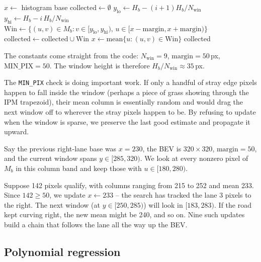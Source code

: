 \begin{algorithm}[H]
\caption{Sliding-window lane-pixel collection (per side)}
\begin{algorithmic}[1]
\State $x \gets$ histogram base
\State $\text{collected}\gets\emptyset$
  \State $y_{\text{lo}} \gets H_b - (i{+}1)H_b/N_{\text{win}}$
  \State $y_{\text{hi}} \gets H_b - i\,H_b/N_{\text{win}}$
  \State $\text{Win}\gets\{(u,v)\in M_b: v\in[y_{\text{lo}},y_{\text{hi}}),\, u\in[x-\text{margin},x+\text{margin})\}$
  \State $\text{collected}\gets\text{collected}\cup\text{Win}$
    \State $x \gets \mathrm{mean}\{u:(u,v)\in\text{Win}\}$
  \EndIf
\EndFor
\State \Return collected
\end{algorithmic}
\end{algorithm}

The constants come straight from the code: $N_{\text{win}}=9$,
$\text{margin}=50$\,px, $\text{MIN\_PIX}=50$. The window height is
therefore $H_b/N_{\text{win}}\approx 35$\,px.

The \texttt{MIN\_PIX} check is doing important work. If only a handful
of stray edge pixels happen to fall inside the window (perhaps a piece
of grass showing through the IPM trapezoid), their mean column is
essentially random and would drag the next window off to wherever the
stray pixels happen to be. By refusing to update when the window is
sparse, we preserve the last good estimate and propagate it upward.

\begin{example}
Say the previous right-lane base was $x=230$, the BEV is
$320\times 320$, $\text{margin}=50$, and the current window spans
$y\in[285,320)$. We look at every nonzero pixel of $M_b$ in this
column band and keep those with $u\in[180,280)$.

Suppose 142 pixels qualify, with columns ranging from 215 to 252 and
mean 233. Since $142\ge 50$, we update $x\leftarrow 233$ -- the search
has tracked the lane 3 pixels to the right. The next window (at
$y\in[250,285)$) will look in $[183,283)$. If the road kept curving
right, the new mean might be 240, and so on. Nine such updates build
a chain that follows the lane all the way up the BEV.
\end{example}

\subsection{Polynomial regression}

